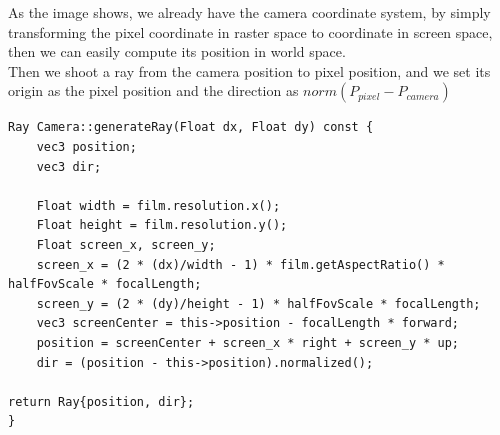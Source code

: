 \documentclass[acmtog]{acmart}
\begin{document}
As the image shows, we already have the camera coordinate system, by simply transforming the pixel coordinate in raster space to coordinate in screen space, 
then we can easily compute its position in world space.\\
Then we shoot a ray from the camera position to pixel position, and we set its origin as the pixel position and the direction as $norm(P_{pixel} - P_{camera})$
\begin{lstlisting}
Ray Camera::generateRay(Float dx, Float dy) const {
	vec3 position;
	vec3 dir;

	Float width = film.resolution.x();
	Float height = film.resolution.y();
	Float screen_x, screen_y;
	screen_x = (2 * (dx)/width - 1) * film.getAspectRatio() * halfFovScale * focalLength;
	screen_y = (2 * (dy)/height - 1) * halfFovScale * focalLength;
	vec3 screenCenter = this->position - focalLength * forward;
	position = screenCenter + screen_x * right + screen_y * up;
	dir = (position - this->position).normalized();

return Ray{position, dir};
}
\end{lstlisting}
\end{document}
